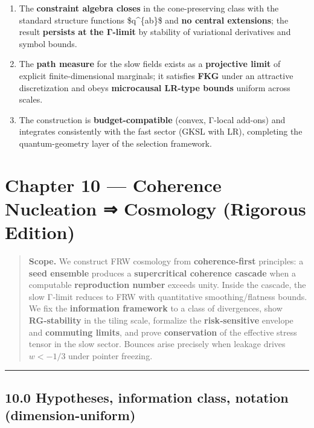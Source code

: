 \documentclass[
]{article}
\providecommand{\tightlist}{%
  \setlength{\itemsep}{0pt}\setlength{\parskip}{0pt}}
\numberwithin{equation}{section}
\begin{document}
\begin{enumerate}
\def\labelenumi{\arabic{enumi}.}
\tightlist
\item
  The \textbf{constraint algebra closes} in the cone-preserving class
  with the standard structure functions \$q\^{}\{ab\}\$ and \textbf{no
  central extensions}; the result \textbf{persists at the Γ-limit} by
  stability of variational derivatives and symbol bounds.
\item
  The \textbf{path measure} for the slow fields exists as a
  \textbf{projective limit} of explicit finite-dimensional marginals; it
  satisfies \textbf{FKG} under an attractive discretization and obeys
  \textbf{microcausal LR-type bounds} uniform across scales.
\item
  The construction is \textbf{budget-compatible} (convex, Γ-local
  add-ons) and integrates consistently with the fast sector (GKSL with
  LR), completing the quantum-geometry layer of the selection framework.
\end{enumerate}

\hypertarget{chapter-10-coherence-nucleation-cosmology-rigorous-edition}{%
\section{Chapter 10 --- Coherence Nucleation ⇒ Cosmology (Rigorous
Edition)}\label{chapter-10-coherence-nucleation-cosmology-rigorous-edition}}

\begin{quote}
\textbf{Scope.} We construct FRW cosmology from \textbf{coherence-first}
principles: a \textbf{seed ensemble} produces a \textbf{supercritical
coherence cascade} when a computable \textbf{reproduction number}
exceeds unity. Inside the cascade, the slow Γ‑limit reduces to FRW with
quantitative smoothing/flatness bounds. We fix the \textbf{information
framework} to a class of divergences, show \textbf{RG‑stability} in the
tiling scale, formalize the \textbf{risk‑sensitive} envelope and
\textbf{commuting limits}, and prove \textbf{conservation} of the
effective stress tensor in the slow sector. Bounces arise precisely when
leakage drives \(w<-1/3\) under pointer freezing.
\end{quote}

\begin{center}\rule{0.5\linewidth}{0.5pt}\end{center}

\hypertarget{hypotheses-information-class-notation-dimensionuniform}{%
\subsection{10.0 Hypotheses, information class, notation
(dimension‑uniform)}\label{hypotheses-information-class-notation-dimensionuniform}}
\end{document}
